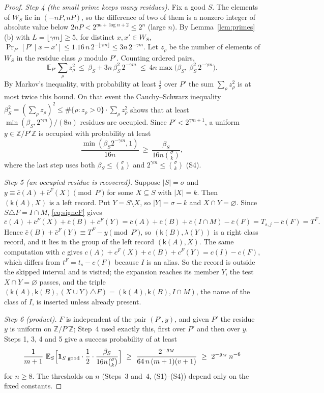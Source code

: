 \documentclass[11pt]{article}
\theoremstyle{definition}
\newcommand{\E}{\mathbb E}
\newcommand{\Z}{\mathbb Z}
\newcommand{\bc}{\bar c}
\newcommand{\abs}[1]{\lvert #1\rvert}
\newcommand{\floor}[1]{\lfloor #1\rfloor}
\newcommand{\key}{\mathsf k}
\begin{document}
\begin{proof}
\emph{Step 4 (the small prime keeps many residues).} Fix a good $S$. The elements of $W_S$ lie in $(-nP,nP)$, so
the difference of two of them is a nonzero integer of absolute value below $2nP<2^{\eta n+\log n+2}\le2^{n}$ (large
$n$). By Lemma~\ref{lem:primes}(b) with $L=\floor{\gamma m}\ge5$, for distinct $x,x'\in W_S$,
$\Pr_{P'}[P'\mid x-x']\le1.16\,n\,2^{-\floor{\gamma m}}\le3n\,2^{-\gamma m}$. Let $z_\rho$ be the number of elements of
$W_S$ in the residue class $\rho$ modulo $P'$. Counting ordered pairs,
\[
 \E_{P'}\sum_\rho z_\rho^2\ \le\ \beta_S+3n\,\beta_S^2\,2^{-\gamma m}\ \le\ 4n\max\bigl(\beta_S,\ \beta_S^2\,2^{-\gamma m}\bigr).
\]
By Markov's inequality, with probability at least $\tfrac12$ over $P'$ the sum $\sum_\rho z_\rho^2$ is at most twice
this bound. On that event the Cauchy--Schwarz inequality
$\beta_S^2=(\sum_\rho z_\rho)^2\le\#\{\rho:z_\rho>0\}\cdot\sum_\rho z_\rho^2$ shows that at least
$\min(\beta_S,2^{\gamma m})/(8n)$ residues are occupied. Since $P'<2^{\gamma m+1}$, a uniform $y\in\Z/P'\Z$ is occupied
with probability at least
\[
 \frac{\min(\beta_S2^{-\gamma m},1)}{16n}\ \ge\ \frac{\beta_S}{16n\binom\sigma k},
\]
where the last step uses both $\beta_S\le\binom\sigma k$ and $2^{\gamma m}\le\binom\sigma k$ \textup{(S4)}.

\emph{Step 5 (an occupied residue is recovered).} Suppose $\abs S=\sigma$ and $y\equiv\bc(A)+\bc^F(X)\pmod{P'}$ for
some $X\subseteq S$ with $\abs X=k$. Then $(\key(A),X)$ is a left record. Put $Y=S\setminus X$, so $\abs Y=\sigma-k$
and $X\cap Y=\varnothing$. Since $S\triangle F=I\cap M$, \eqref{eq:signcF} gives
\[
 \bc(A)+\bc^F(X)+\bc(B)+\bc^F(Y)=\bc(A)+\bc(B)+\bc(I\cap M)-\bc(F)=T_{s,j}-\bc(F)=T^F .
\]
Hence $\bc(B)+\bc^F(Y)\equiv T^F-y\pmod{P'}$, so $(\key(B),\lambda(Y))$ is a right class record, and it lies in the
group of the left record $(\key(A),X)$. The same computation with $c$ gives $c(A)+c^F(X)+c(B)+c^F(Y)=c(I)-c(F)$,
which differs from $t^F=t_s-c(F)$ because $I$ is an alias. So the record is outside the skipped interval and is
visited; the expansion reaches its member $Y$, the test $X\cap Y=\varnothing$ passes, and the triple
$(\key(A),\key(B),(X\cup Y)\triangle F)=(\key(A),\key(B),I\cap M)$, the name of the class of $I$, is inserted unless
already present.

\emph{Step 6 (product).} $F$ is independent of the pair $(P',y)$, and given $P'$ the residue $y$ is uniform on
$\Z/P'\Z$; Step~4 used exactly this, first over $P'$ and then over $y$. Steps 1, 3, 4 and 5 give a success probability of at
least
\[
 \frac1{m+1}\ \E_S\Bigl[\mathbf 1_{S\text{ good}}\cdot\frac12\cdot\frac{\beta_S}{16n\binom\sigma k}\Bigr]
 \ \ge\ \frac{2^{-g_M}}{64\,n\,(m+1)(v+1)}\ \ge\ 2^{-g_M}\,n^{-6}
\]
for $n\ge8$. The thresholds on $n$ (Steps~3 and~4, \textup{(S1)--(S4)}) depend only on the fixed constants.
\end{proof}
\end{document}
